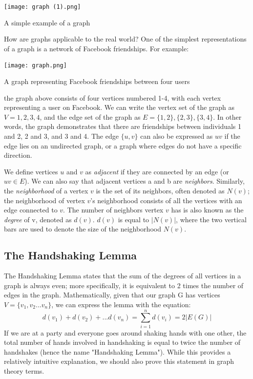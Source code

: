 \documentclass{article}
\begin{document}
\begin{multicols}{2}
\begin{center}
    \texttt{[image: graph (1).png]}
    
    A simple example of a graph
\end{center}

How are graphs applicable to the real world? One of the simplest representations of a graph is a network of Facebook friendships. For example:

\begin{center}
    \texttt{[image: graph.png]}

    A graph representing Facebook friendships between four users
\end{center}

the graph above consists of four vertices numbered 1-4, with each vertex representing a user on Facebook. We can write the vertex set of the graph as $V={1, 2, 3, 4}$, and the edge set of the graph as $E={\{1,2\}, \{2,3\}, \{3,4\}}$. In other words, the graph demonstrates that there are friendships between individuals 1 and 2, 2 and 3, and 3 and 4. The edge $\{u, v\}$ can also be expressed as $uv$ if the edge lies on an undirected graph, or a graph where edges do not have a specific direction.

We define vertices $u$ and $v$ as \textit{adjacent} if they are connected by an edge (or $uv\in E$). We can also say that adjacent vertices a and b are \textit{neighbors}. Similarly, the \textit{neighborhood} of a vertex $v$ is the set of its neighbors, often denoted as $N(v)$; the neighborhood of vertex $v$'s neighborhood consists of all the vertices with an edge connected to $v$. The number of neighbors vertex $v$ has is also known as the \textit{degree} of v, denoted as $d(v)$. $d(v)$ is equal to $\vert N(v) \vert$, where the two vertical bars are used to denote the size of the neighborhood $N(v)$. 
\subsection*{The Handshaking Lemma}
The Handshaking Lemma states that the sum of the degrees of all vertices in a graph is always even; more specifically, it is equivalent to 2 times the number of edges in the graph. Mathematically, given that our graph G has vertices $V=\{v_1, v_2 ... v_n\}$, we can express the lemma with the equation:
\begin{equation*}
d(v_1)+d(v_2)+...d(v_n) = \sum^{n}_{i=1} d(v_i) = 2|E(G)|
\end{equation*}
If we are at a party and everyone goes around shaking hands with one other, the total number of hands involved in handshaking is equal to twice the number of handshakes (hence the name "Handshaking Lemma"). While this provides a relatively intuitive explanation, we should also prove this statement in graph theory terms. 


\end{multicols}
\end{document}
